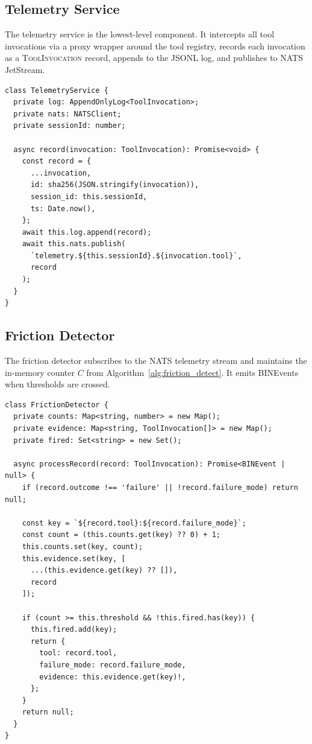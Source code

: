 \documentclass[11pt]{article}
\begin{document}
\subsection{Telemetry Service}

The telemetry service is the lowest-level component. It intercepts all tool
invocations via a proxy wrapper around the tool registry, records each
invocation as a \textsc{ToolInvocation} record, appends to the JSONL log,
and publishes to NATS JetStream.

\begin{verbatim}
class TelemetryService {
  private log: AppendOnlyLog<ToolInvocation>;
  private nats: NATSClient;
  private sessionId: number;

  async record(invocation: ToolInvocation): Promise<void> {
    const record = {
      ...invocation,
      id: sha256(JSON.stringify(invocation)),
      session_id: this.sessionId,
      ts: Date.now(),
    };
    await this.log.append(record);
    await this.nats.publish(
      `telemetry.${this.sessionId}.${invocation.tool}`,
      record
    );
  }
}
\end{verbatim}

\subsection{Friction Detector}

The friction detector subscribes to the NATS telemetry stream and maintains
the in-memory counter $C$ from Algorithm~\ref{alg:friction_detect}. It
emits BINEvents when thresholds are crossed.

\begin{verbatim}
class FrictionDetector {
  private counts: Map<string, number> = new Map();
  private evidence: Map<string, ToolInvocation[]> = new Map();
  private fired: Set<string> = new Set();

  async processRecord(record: ToolInvocation): Promise<BINEvent | null> {
    if (record.outcome !== 'failure' || !record.failure_mode) return null;

    const key = `${record.tool}:${record.failure_mode}`;
    const count = (this.counts.get(key) ?? 0) + 1;
    this.counts.set(key, count);
    this.evidence.set(key, [
      ...(this.evidence.get(key) ?? []),
      record
    ]);

    if (count >= this.threshold && !this.fired.has(key)) {
      this.fired.add(key);
      return {
        tool: record.tool,
        failure_mode: record.failure_mode,
        evidence: this.evidence.get(key)!,
      };
    }
    return null;
  }
}
\end{verbatim}
\end{document}
